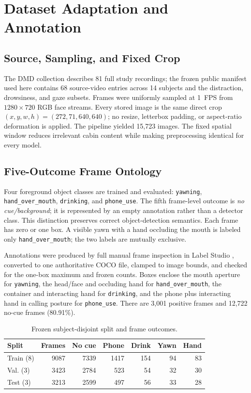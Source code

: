 \documentclass[conference]{IEEEtran}
\begin{document}
\section{Dataset Adaptation and Annotation}
\subsection{Source, Sampling, and Fixed Crop}
The DMD collection describes 81 full study recordings; the frozen public manifest used here contains 68 source-video entries across 14 subjects and the distraction, drowsiness, and gaze subsets. Frames were uniformly sampled at 1~FPS from $1280\times720$ RGB face streams. Every stored image is the same direct crop $(x,y,w,h)=(272,71,640,640)$; no resize, letterbox padding, or aspect-ratio deformation is applied. The pipeline yielded 15,723 images. The fixed spatial window reduces irrelevant cabin content while making preprocessing identical for every model.

\subsection{Five-Outcome Frame Ontology}
Four foreground object classes are trained and evaluated: \texttt{yawning}, \texttt{hand\_over\_mouth}, \texttt{drinking}, and \texttt{phone\_use}. The fifth frame-level outcome is \textit{no cue/background}; it is represented by an empty annotation rather than a detector class. This distinction preserves correct object-detection semantics. Each frame has zero or one box. A visible yawn with a hand occluding the mouth is labeled only \texttt{hand\_over\_mouth}; the two labels are mutually exclusive.

Annotations were produced by full manual frame inspection in Label Studio \cite{labelstudio}, converted to one authoritative COCO file, clamped to image bounds, and checked for the one-box maximum and frozen counts. Boxes enclose the mouth aperture for \texttt{yawning}, the head/face and occluding hand for \texttt{hand\_over\_mouth}, the container and interacting hand for \texttt{drinking}, and the phone plus interacting hand in calling posture for \texttt{phone\_use}. There are 3,001 positive frames and 12,722 no-cue frames (80.91\%).

\begin{table}[t]
\caption{Frozen subject-disjoint split and frame outcomes.}
\label{tab:split}
\centering
\begin{tabular}{lrrrrrr}
\toprule
Split & Frames & No cue & Phone & Drink & Yawn & Hand \\
\midrule
Train (8) & 9087 & 7339 & 1417 & 154 & 94 & 83 \\
Val. (3)  & 3423 & 2784 & 523  & 54  & 32 & 30 \\
Test (3)  & 3213 & 2599 & 497  & 56  & 33 & 28 \\
\bottomrule
\end{tabular}
\end{table}
\end{document}
